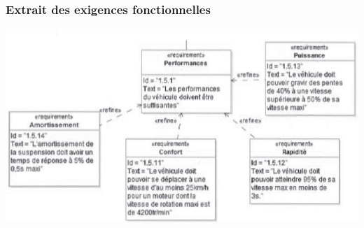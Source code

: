 \documentclass[10pt,fleqn]{article} %
\begin{document}
\begin{multicols}{2}
\subsubsection*{Extrait des exigences fonctionnelles}
%
\begin{center}
	\includegraphics[width=\linewidth]{images/fig_02_bis}
\end{center}
%
%
%
%
%
%
%
%





\end{multicols}
\end{document}
